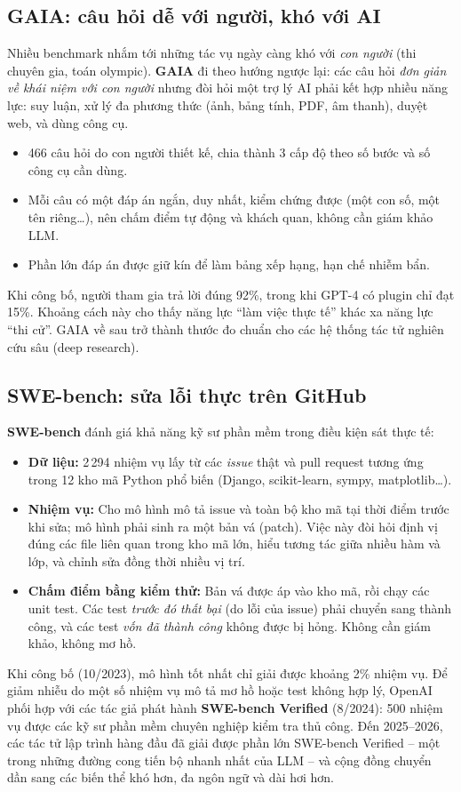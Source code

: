 \subsection{GAIA: câu hỏi dễ với người, khó với AI}
\label{ssec:gaia}
Nhiều benchmark nhắm tới những tác vụ ngày càng khó với \emph{con người} (thi chuyên gia, toán olympic). \textbf{GAIA} \cite{mialon2024gaia} đi theo hướng ngược lại: các câu hỏi \emph{đơn giản về khái niệm với con người} nhưng đòi hỏi một trợ lý AI phải kết hợp nhiều năng lực: suy luận, xử lý đa phương thức (ảnh, bảng tính, PDF, âm thanh), duyệt web, và dùng công cụ.
\begin{itemize}
	\item 466 câu hỏi do con người thiết kế, chia thành 3 cấp độ theo số bước và số công cụ cần dùng.
	\item Mỗi câu có một đáp án ngắn, duy nhất, kiểm chứng được (một con số, một tên riêng\ldots), nên chấm điểm tự động và khách quan, không cần giám khảo LLM.
	\item Phần lớn đáp án được giữ kín để làm bảng xếp hạng, hạn chế nhiễm bẩn.
\end{itemize}
Khi công bố, người tham gia trả lời đúng 92\%, trong khi GPT-4 có plugin chỉ đạt 15\%. Khoảng cách này cho thấy năng lực “làm việc thực tế” khác xa năng lực “thi cử”. GAIA về sau trở thành thước đo chuẩn cho các hệ thống tác tử nghiên cứu sâu (deep research).

\subsection{SWE-bench: sửa lỗi thực trên GitHub}
\label{ssec:swebench}
\textbf{SWE-bench} \cite{jimenez2024swebench} đánh giá khả năng kỹ sư phần mềm trong điều kiện sát thực tế:
\begin{itemize}
	\item \textbf{Dữ liệu:} 2\,294 nhiệm vụ lấy từ các \emph{issue} thật và pull request tương ứng trong 12 kho mã Python phổ biến (Django, scikit-learn, sympy, matplotlib\ldots).
	\item \textbf{Nhiệm vụ:} Cho mô hình mô tả issue và toàn bộ kho mã tại thời điểm trước khi sửa; mô hình phải sinh ra một bản vá (patch). Việc này đòi hỏi định vị đúng các file liên quan trong kho mã lớn, hiểu tương tác giữa nhiều hàm và lớp, và chỉnh sửa đồng thời nhiều vị trí.
	\item \textbf{Chấm điểm bằng kiểm thử:} Bản vá được áp vào kho mã, rồi chạy các unit test. Các test \emph{trước đó thất bại} (do lỗi của issue) phải chuyển sang thành công, và các test \emph{vốn đã thành công} không được bị hỏng. Không cần giám khảo, không mơ hồ.
\end{itemize}
Khi công bố (10/2023), mô hình tốt nhất chỉ giải được khoảng 2\% nhiệm vụ. Để giảm nhiễu do một số nhiệm vụ mô tả mơ hồ hoặc test không hợp lý, OpenAI phối hợp với các tác giả phát hành \textbf{SWE-bench Verified} \cite{openai2024sweverified} (8/2024): 500 nhiệm vụ được các kỹ sư phần mềm chuyên nghiệp kiểm tra thủ công. Đến 2025--2026, các tác tử lập trình hàng đầu đã giải được phần lớn SWE-bench Verified -- một trong những đường cong tiến bộ nhanh nhất của LLM -- và cộng đồng chuyển dần sang các biến thể khó hơn, đa ngôn ngữ và dài hơi hơn.

